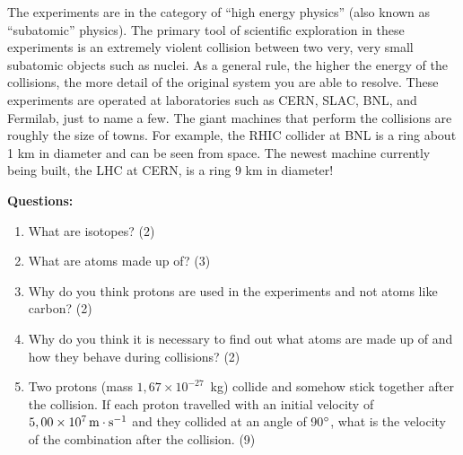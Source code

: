 {The experiments are in the category of ``high energy physics'' (also known
as ``subatomic'' physics). The primary tool of scientific exploration in
these experiments is an extremely violent collision between two very, very
small subatomic objects such as nuclei. As a general rule, the higher the
energy of the collisions, the more detail of the original system you are
able to resolve. These experiments are operated at laboratories such as
CERN, SLAC, BNL, and Fermilab, just to name a few. The giant machines that
perform the collisions are roughly the size of towns. For example, the RHIC
collider at BNL is a ring about 1 km in diameter and can be seen from space.
The newest machine currently being built, the LHC at CERN, is a ring 9 km in
diameter!

{\textbf{Questions:}
\begin{enumerate}
\item{What are isotopes?  (2)}
\item{What are atoms made up of?  (3)}
\item{Why do you think protons are used in the experiments and not atoms like carbon?  (2)}
\item {Why do you think it is necessary to find out what atoms are made up of and how they behave during collisions?  (2)}
\item{Two protons (mass $1,67\times 10^{-27}$~kg) collide and somehow stick together after the collision. If each proton travelled with an initial velocity of $5,00\times 10^{7}\,\mathrm{m \cdot s^{-1}}$ and they collided at an angle of 90$^{\circ}$, what is the velocity of the combination after the collision.   (9)}
\end{enumerate}




}}
